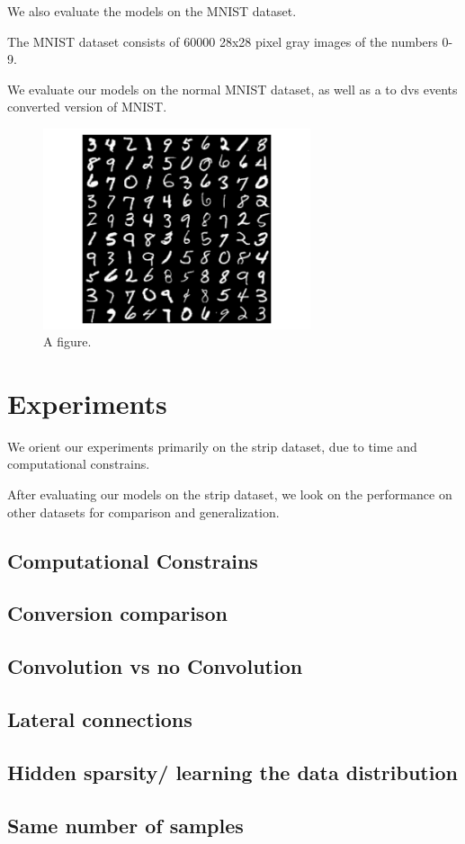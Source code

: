 We also evaluate the models on the MNIST dataset. 

The MNIST dataset consists of 60000 28x28 pixel gray images of the numbers 0-9.

We evaluate our models on the normal MNIST dataset, as well as a to dvs events converted version of MNIST.

\begin{figure}
	\centering
    	\includegraphics[width=0.7\textwidth]{imgs/mnist.png} 
    \caption{A figure.}
	\label{fig:test}
\end{figure}

\section{Experiments}

We orient our experiments primarily on the strip dataset, due to time and computational constrains.

After evaluating our models on the strip dataset, we look on the performance on other datasets for comparison and generalization.     

\subsection{Computational Constrains}

\subsection{Conversion comparison}

\subsection{Convolution vs no Convolution}

\subsection{Lateral connections}

\subsection{Hidden sparsity/ learning the data distribution}

\subsection{Same number of samples}

 